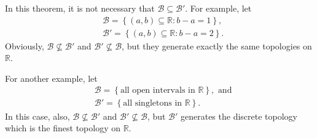 \begin{note}
	In this theorem, it is not necessary that $\mathcal B \subseteq \mathcal B'$. For example, let 
	$$
	\begin{aligned}
		& \mathcal B = \left\{ (a, b) \subseteq \mathbb R : b - a = 1 \right\}, \\
		& \mathcal B' = \left\{ (a, b) \subseteq \mathbb R : b - a = 2 \right\}.
	\end{aligned}
	$$
	Obviously, $\mathcal B \not \subseteq \mathcal B'$ and $\mathcal B' \not \subseteq \mathcal B$, but they generate exactly the same topologies on $\mathbb R$.

	For another example, let
	$$
	\begin{aligned}
		& \mathcal B = \left\{ \text{all open intervals in $\mathbb R$}\right\}, \text{ and} \\
		& \mathcal B' = \left\{ \text{all singletons in $\mathbb R$} \right\}.
	\end{aligned}
	$$
	In this case, also, $\mathcal B \not \subseteq \mathcal B'$ and $\mathcal B' \not \subseteq \mathcal B$, but $\mathcal B'$ generates the discrete topology which is the finest topology on $\mathbb R$.
\end{note}



